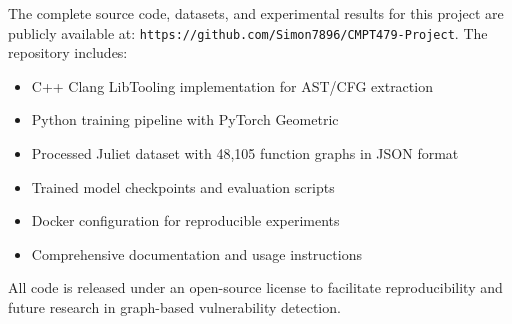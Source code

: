 The complete source code, datasets, and experimental results for this project are publicly available at: \texttt{https://github.com/Simon7896/CMPT479-Project}. The repository includes:
\begin{itemize}
\item C++ Clang LibTooling implementation for AST/CFG extraction
\item Python training pipeline with PyTorch Geometric
\item Processed Juliet dataset with 48,105 function graphs in JSON format
\item Trained model checkpoints and evaluation scripts
\item Docker configuration for reproducible experiments
\item Comprehensive documentation and usage instructions
\end{itemize}

All code is released under an open-source license to facilitate reproducibility and future research in graph-based vulnerability detection.

\printbibliography



